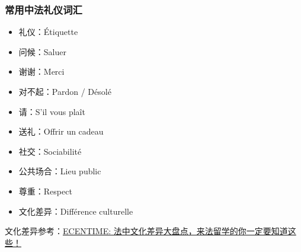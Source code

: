 \subsubsection{常用中法礼仪词汇}
\begin{itemize}
    \item 礼仪：Étiquette
    \item 问候：Saluer
    \item 谢谢：Merci
    \item 对不起：Pardon / Désolé
    \item 请：S’il vous plaît
    \item 送礼：Offrir un cadeau
    \item 社交：Sociabilité
    \item 公共场合：Lieu public
    \item 尊重：Respect
    \item 文化差异：Différence culturelle
\end{itemize}

文化差异参考：\href{https://www.ecentime.com/article/difference-culturelle}{ECENTIME: 法中文化差异大盘点，来法留学的你一定要知道这些！}
